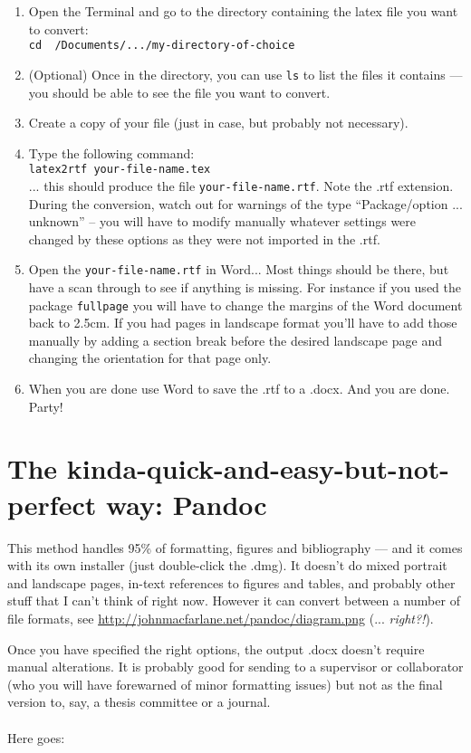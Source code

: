 \documentclass{article}
\begin{document}
\begin{enumerate}
\item Open the Terminal and go to the directory containing the latex file
  you want to convert:\\
\texttt{cd ~/Documents/.../my-directory-of-choice}
\item (Optional) Once in the directory, you can use \texttt{ls} to list
  the files it contains --- you should be able to see the file
  you want to convert.
\item Create a copy of your file (just in case, but probably not necessary).
\item Type the following command:\\
\texttt{latex2rtf your-file-name.tex} \\
... this should produce the file \texttt{your-file-name.rtf}. Note the
.rtf extension. During the conversion, watch out for warnings of the type ``Package/option ... unknown'' --
you will have to modify manually whatever settings were changed by
these options as they were not imported in the .rtf.
\item Open the \texttt{your-file-name.rtf} in Word... Most things should be
  there, but have a scan through to see if anything is missing. For
  instance if you used the package \texttt{fullpage} you will have to
  change the margins of the Word document back to 2.5cm. If you had
  pages in landscape format you'll have to add
  those manually by adding a section break before the desired
  landscape page and changing the orientation for that page only.
\item When you are done use Word to save the .rtf to a .docx. And you
  are done. Party!
\end{enumerate}




\section{The kinda-quick-and-easy-but-not-perfect way: Pandoc}
\label{sec::pandoc}
This method handles 95\% of formatting, figures and bibliography --- and
it comes with its own installer (just
double-click the .dmg). It doesn't do mixed portrait and landscape pages, in-text references to
figures and tables, and probably other stuff that I can't think of
right now. However it can convert between a number of file formats,
see \url{http://johnmacfarlane.net/pandoc/diagram.png} (... \emph{right?!}).

Once you have specified the right options, the output .docx doesn't require manual alterations. It is probably
good for sending to a supervisor or collaborator (who you will have forewarned of
minor formatting issues) but not as the final version to, say, a thesis
committee or a journal.\\
\\
Here goes:
\end{document}
